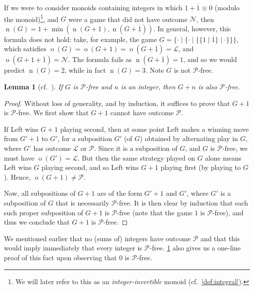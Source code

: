 \documentclass[11pt]{article}
\newtheorem{lemma}[theorem]{Lemma}
\theoremstyle{definition}
\DeclareMathOperator{\outcome}{o}
\DeclareMathOperator{\ntp}{n}
\begin{document}
If we were to consider monoids containing integers in which
$1+\overline{1}\equiv0$ (modulo the monoid)\footnote{We will later refer to
this as an \emph{integer-invertible} monoid (cf.\ \cref{def:integral}).}, and
$G$ were a game that did not have outcome $\mathscr{N}$, then
$\ntp(G)=1+\min(\ntp(G+1),\ntp(G+\overline{1}))$. In general, however, this
formula does not hold: take, for example, the game
$G=\{\cdot\mid\{\cdot\mid\{\{1\mid\overline{1}\}\mid\cdot\}\}\}$, which
satisfies $\outcome(G)=\outcome(G+1)=\outcome(G+\overline{1})=\mathscr{L}$, and
$\outcome(G+1+\overline{1})=\mathscr{N}$. The formula fails as
$\ntp(G+\overline{1})=1$, and so we would predict $\ntp(G)=2$, while in fact
$\ntp(G)=3$. Note $G$ is not $\mathscr{P}$-free.

\begin{lemma}[cf.\ {\cite[Lemma 6 on p.~6]{milley.renault:invertible}}]
    \label{lem:p-free-plus-integer}
    If $G$ is $\mathscr{P}$-free and $n$ is an integer, then $G+n$ is also
    $\mathscr{P}$-free.
\end{lemma}

\begin{proof}
    Without loss of generality, and by induction, it suffices to prove that
    $G+1$ is $\mathscr{P}$-free. We first show that $G+1$ cannot have outcome
    $\mathscr{P}$.

    If Left wins $G+1$ playing second, then at some point Left makes a winning
    move from $G'+1$ to $G'$, for a subposition $G'$ (of $G$) obtained by
    alternating play in $G$, where $G'$ has outcome $\mathscr{L}$ or
    $\mathscr{P}$. Since it is a subposition of $G$, and $G$ is
    $\mathscr{P}$-free, we must have $\outcome(G')=\mathscr{L}$. But then the
    same strategy played on $G$ alone means Left wins $G$ playing second, and
    so Left wins $G+1$ playing first (by playing to $G$). Hence,
    $\outcome(G+1)\neq\mathscr{P}$.

    Now, all subpositions of $G+1$ are of the form $G'+1$ and $G'$, where $G'$
    is a subposition of $G$ that is necessarily $\mathscr{P}$-free. It is then
    clear by induction that each such proper subposition of $G+1$ is
    $\mathscr{P}$-free (note that the game $1$ is $\mathscr{P}$-free), and thus
    we conclude that $G+1$ is $\mathscr{P}$-free.
\end{proof}

We mentioned earlier that no (sums of) integers have outcome $\mathscr{P}$ and
that this would imply immediately that every integer is $\mathscr{P}$-free.
\cref{lem:p-free-plus-integer} also gives us a one-line proof of this fact upon
observing that 0 is $\mathscr{P}$-free.
\end{document}
